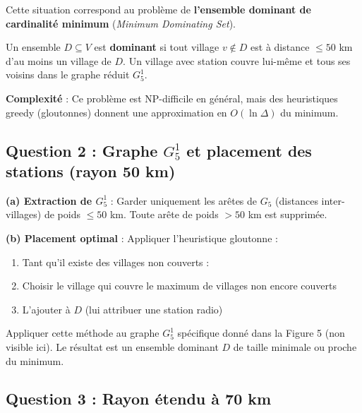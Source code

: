 \documentclass[12pt,a4paper]{article}
\begin{document}
\begin{solution}
Cette situation correspond au problème de \textbf{l'ensemble dominant de cardinalité minimum} (\textit{Minimum Dominating Set}).

Un ensemble $D \subseteq V$ est \textbf{dominant} si tout village $v \notin D$ est à distance $\le 50$ km d'au moins un village de $D$. Un village avec station couvre lui-même et tous ses voisins dans le graphe réduit $G_5^1$.

\textbf{Complexité} : Ce problème est NP-difficile en général, mais des heuristiques greedy (gloutonnes) donnent une approximation en $O(\ln \Delta)$ du minimum.
\end{solution}

\subsection{Question 2 : Graphe $G_5^1$ et placement des stations (rayon 50 km)}

\begin{solution}
\textbf{(a) Extraction de $G_5^1$} : 
Garder uniquement les arêtes de $G_5$ (distances inter-villages) de poids $\le 50$ km. Toute arête de poids $> 50$ km est supprimée.

\textbf{(b) Placement optimal} : Appliquer l'heuristique gloutonne :
\begin{enumerate}
    \item Tant qu'il existe des villages non couverts :
    \item Choisir le village qui couvre le maximum de villages non encore couverts
    \item L'ajouter à $D$ (lui attribuer une station radio)
\end{enumerate}

\begin{remarque}
Appliquer cette méthode au graphe $G_5^1$ spécifique donné dans la Figure 5 (non visible ici). Le résultat est un ensemble dominant $D$ de taille minimale ou proche du minimum.
\end{remarque}
\end{solution}

\subsection{Question 3 : Rayon étendu à 70 km}
\end{document}
